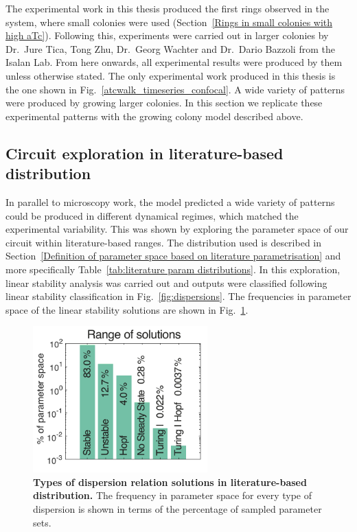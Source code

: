 The experimental work in this thesis produced the first rings observed in the system, where small colonies were used (Section~\ref{Rings in small colonies with high aTc}).
Following this, experiments were carried out in larger colonies by Dr.~Jure Tica, Tong Zhu, Dr.~Georg Wachter and Dr.~Dario Bazzoli from the Isalan Lab.
From here onwards, all experimental results were produced by them unless otherwise stated.
The only experimental work produced in this thesis is the one shown in Fig.~\ref{atcwalk_timeseries_confocal}.
A wide variety of patterns were produced by growing larger colonies.
In this section we replicate these experimental patterns with the growing colony model described above.
\subsection{Circuit exploration in literature-based distribution}
In parallel to microscopy work, the model predicted a wide variety of patterns could be produced in different dynamical regimes, which matched the experimental variability.
This was shown by exploring the parameter space of our circuit within literature-based ranges.
The distribution used is described in Section~\ref{Definition of parameter space based on literature parametrisation} and more specifically Table~\ref{tab:literature param distributions}.
In this exploration, linear stability analysis was carried out and outputs were classified following linear stability classification in Fig.~\ref{fig:dispersions}.
The frequencies in parameter space of the linear stability solutions are shown in Fig.~\ref{system_class_frequencies}.
\begin{figure}[H]
    \centering

    \includegraphics[width=0.6\textwidth]{chapters/Chapter 3/system_class_frequencies}
    \caption{\textbf{Types of dispersion relation solutions in literature-based distribution.} The frequency in parameter space for every type of dispersion is shown in terms of the percentage of sampled parameter sets.}
    \label{system_class_frequencies}
\end{figure}

